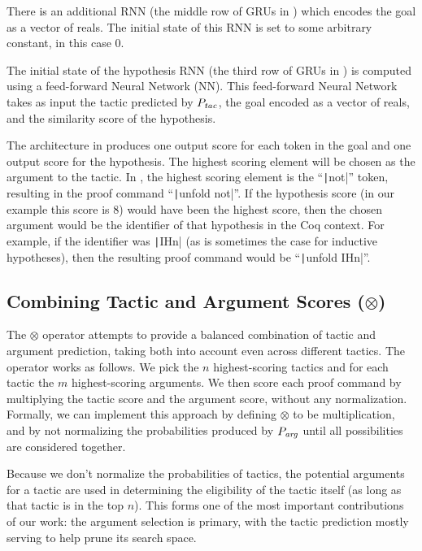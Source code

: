 \documentclass[sigplan,screen]{acmart}
\newcommand{\coqinline}[1]{\texttt|#1|}
\newcommand{\PTac}{P_{\it tac}}
\newcommand{\PArg}{P_{\it arg}}
\newcommand{\Combine}{\otimes}
\renewcommand{\>}{\quad}
\begin{document}
There is an additional RNN (the middle row of GRUs in ) which encodes the goal as a vector of reals.
The initial state of this RNN is set to some arbitrary constant, in this case $0$.

The initial state of the hypothesis RNN (the third row of GRUs in ) is computed using a feed-forward Neural Network (NN).
This feed-forward Neural Network takes as input the tactic predicted by $\PTac$, the goal encoded as a vector of reals, and the similarity score of the hypothesis.

The architecture in  produces one output score for each token in the goal and one output score for the hypothesis.
The highest scoring element will be chosen as the argument to the tactic.
In , the highest scoring element is the ``\coqinline{not}'' token, resulting in the proof command ``\coqinline{unfold not}''.
If the hypothesis score (in our example this score is $8$) would have been the highest score, then the chosen argument would be the identifier of that hypothesis in the Coq context.
For example, if the identifier was \coqinline{IHn} (as is sometimes the case for inductive hypotheses), then the resulting proof command would be ``\coqinline{unfold IHn}''.

\subsection{Combining Tactic and Argument Scores ($\Combine$)}

The $\Combine$ operator attempts to provide a balanced combination
  of tactic and argument prediction,
  taking both into account even across different tactics.
The operator works as follows. We pick the $n$ highest-scoring
tactics and for each tactic the $m$ highest-scoring arguments. We then score
each proof command by multiplying the tactic score and the argument score,
without any normalization. Formally, we can implement this approach by defining
$\Combine$ to be multiplication, and by not normalizing the probabilities
produced by $\PArg$ until all possibilities are considered together.

Because we don't normalize the probabilities of tactics, the potential
arguments for a tactic are used in determining the eligibility of the
tactic itself (as long as that tactic is in the top $n$). This forms
one of the most important contributions of our work: the argument
selection is primary, with the tactic prediction mostly serving to
help prune its search space.
\end{document}
